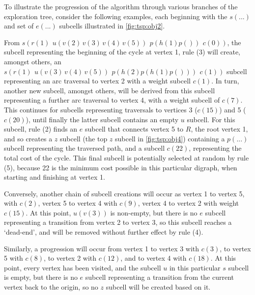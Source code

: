 To illustrate the progression of the algorithm through various branches of the exploration tree, consider the following examples, each beginning with the \(s(...)\) and set of \(e(...)\) subcells illustrated in \autoref{fig:tsp:obj2}.

From \(s(r(1) ~ \,u(v(2)\,v(3)\,v(4)\,v(5))\, ~ p(h(1)p()) ~ \,c(0))\), the subcell representing the beginning of the cycle at vertex 1, rule (3) will create, amongst others, an \(s(r(1) ~ \,u(v(3)\,v(4)\,v(5)) ~ \,p(h(2)p(h(1)p())) ~ \,c(1))\) subcell representing an arc traversal to vertex 2 with a weight subcell \(c(1)\).  In turn, another new subcell, amongst others, will be derived from this subcell representing a further arc traversal to vertex 4, with a weight subcell of \(c(7)\).  This continues for subcells representing traversals to vertices 3 (\(c(15)\)) and 5 (\(c(20)\)), until finally the latter subcell contains an empty \(u\) subcell.  For this subcell, rule (2) finds an \(e\) subcell that connects vertex 5 to \(R\), the root vertex 1, and so creates a \(z\) subcell (the top \(z\) subcell in \autoref{fig:tsp:obj4}) containing a \(p(...)\) subcell representing the traversed path, and a subcell \(c(22)\), representing the total cost of the cycle.  This final subcell is potentially selected at random by rule (5), because 22 is the minimum cost possible in this particular digraph, when starting and finishing at vertex 1.

Conversely, another chain of subcell creations will occur as vertex 1 to vertex 5, with \(c(2)\), vertex 5 to vertex 4 with \(c(9)\), vertex 4 to vertex 2 with weight \(c(15)\).  At this point, \(u(v(3))\) is non-empty, but there is no \(e\) subcell representing a transition from vertex 2 to vertex 3, so this subcell reaches a `dead-end', and will be removed without further effect by rule (4).

Similarly, a progression will occur from vertex 1 to vertex 3 with \(c(3)\), to vertex 5 with \(c(8)\), to vertex 2 with \(c(12)\), and to vertex 4 with \(c(18)\).  At this point, every vertex has been visited, and the subcell \(u\) in this particular \(s\) subcell is empty, but there is no \(e\) subcell representing a transition from the current vertex back to the origin, so no \(z\) subcell will be created based on it.


